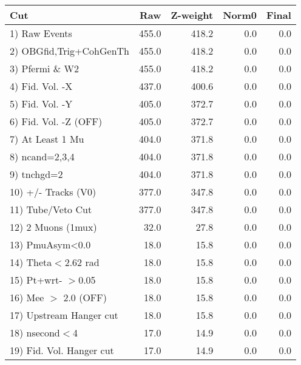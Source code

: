  \begin{table}[h!]\centering
 \begin{tabular}{||l||r|r|r|r||}
 \hline
 \hline
 Cut & Raw & Z-weight & Norm0 & Final \\
 \hline
  1) Raw Events           &       455.0 &       418.2 &         0.0 &         0.0 \\
  2) OBGfid,Trig+CohGenTh &       455.0 &       418.2 &         0.0 &         0.0 \\
  3) Pfermi \& W2         &       455.0 &       418.2 &         0.0 &         0.0 \\
  4) Fid. Vol. -X         &       437.0 &       400.6 &         0.0 &         0.0 \\
  5) Fid. Vol. -Y         &       405.0 &       372.7 &         0.0 &         0.0 \\
  6) Fid. Vol. -Z (OFF)   &       405.0 &       372.7 &         0.0 &         0.0 \\
  7) At Least 1 Mu        &       404.0 &       371.8 &         0.0 &         0.0 \\
  8) ncand=2,3,4          &       404.0 &       371.8 &         0.0 &         0.0 \\
  9) tnchgd=2             &       404.0 &       371.8 &         0.0 &         0.0 \\
 10) +/- Tracks (V0)      &       377.0 &       347.8 &         0.0 &         0.0 \\
 11) Tube/Veto Cut        &       377.0 &       347.8 &         0.0 &         0.0 \\
 12) 2 Muons (1mux)       &        32.0 &        27.8 &         0.0 &         0.0 \\
 13) PmuAsym<0.0          &        18.0 &        15.8 &         0.0 &         0.0 \\
 14) Theta$<$2.62 rad     &        18.0 &        15.8 &         0.0 &         0.0 \\
 15) Pt+wrt- $>$0.05      &        18.0 &        15.8 &         0.0 &         0.0 \\
 16) Mee $>$ 2.0  (OFF)   &        18.0 &        15.8 &         0.0 &         0.0 \\
 17) Upstream Hanger cut  &        18.0 &        15.8 &         0.0 &         0.0 \\
 18) nsecond$<$4          &        17.0 &        14.9 &         0.0 &         0.0 \\
 19) Fid. Vol. Hanger cut &        17.0 &        14.9 &         0.0 &         0.0 \\

\end{tabular}
\end{table}
